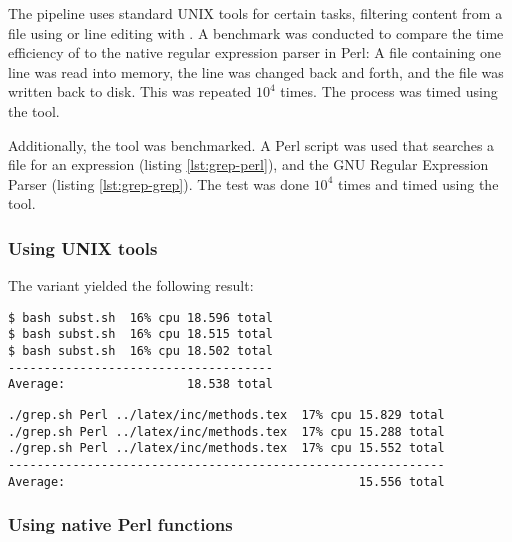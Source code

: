 The \hamstr pipeline uses standard UNIX tools for certain tasks, \eg filtering
content from a file using  or line editing with . A
benchmark was conducted to compare the time efficiency of  to the
native regular expression parser in Perl: A file containing one line was read
into memory, the line was changed back and forth, and the file was written back
to disk. This was repeated $10^4$ times. The process was timed using the
 tool.

Additionally, the  tool was benchmarked. A Perl script was used that
searches a file for an expression (listing \ref{lst:grep-perl}), and the GNU
Regular Expression Parser  (listing \ref{lst:grep-grep}). The test
was done $10^4$ times and timed using the  tool.

\subsubsection{Using UNIX tools}



The  variant yielded the following result:

\begin{verbatim}
$ bash subst.sh  16% cpu 18.596 total
$ bash subst.sh  16% cpu 18.515 total
$ bash subst.sh  16% cpu 18.502 total
-------------------------------------
Average:                 18.538 total
\end{verbatim}



\begin{verbatim}
./grep.sh Perl ../latex/inc/methods.tex  17% cpu 15.829 total
./grep.sh Perl ../latex/inc/methods.tex  17% cpu 15.288 total
./grep.sh Perl ../latex/inc/methods.tex  17% cpu 15.552 total
-------------------------------------------------------------
Average:                                         15.556 total
\end{verbatim}

\subsubsection{Using native Perl functions}



